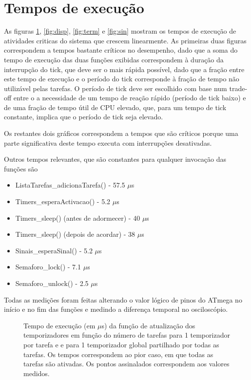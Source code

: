 \documentclass[journal]{IEEEtran}
\begin{document}
\section{Tempos de execução}

As figuras \ref{fig:timers}, \ref{fig:disp}, \ref{fig:term} e \ref{fig:sin} mostram os tempos de execução de atividades criticas do sistema que crescem linearmente.
As primeiras duas figuras correspondem a tempos bastante críticos no desempenho, dado que a soma do tempo de execução das duas funções exibidas correspondem à duração da
interrupção do tick, que deve ser o mais rápida possível, dado que a fração entre este tempo de execução e o período do tick corresponde à fração de tempo não utilizável
pelas tarefas.
O período de tick deve ser escolhido com base num trade-off entre o a necessidade de um tempo de reação rápido (período de tick baixo) e de uma fração de tempo útil de
CPU elevado, que, para um tempo de tick constante, implica que o período de tick seja elevado.

Os restantes dois gráficos correspondem a tempos que são críticos porque uma parte significativa deste tempo executa com interrupções desativadas.

Outros tempos relevantes, que são constantes para qualquer invocação das funções são
\begin{itemize}
	\item ListaTarefas\_adicionaTarefa() - 57.5 $\mu$s
	\item Timers\_esperaActivacao() - 5.2 $\mu$s
	\item Timers\_sleep() (antes de adormecer) - 40 $\mu$s
	\item Timers\_sleep() (depois de acordar) - 38 $\mu$s
	\item Sinais\_esperaSinal() - 5.2 $\mu$s
	\item Semaforo\_lock() - 7.1 $\mu$s
	\item Semaforo\_unlock() - 2.5 $\mu$s 
\end{itemize}

Todas as medições foram feitas alterando o valor lógico de pinos do ATmega no início e no fim das funções e medindo a diferença temporal no osciloscópio.

\begin{figure}
	\centering
	\resizebox{0.5\textwidth}{!}{\large }
	\caption{Tempo de execução (em $\mu$s) da função de atualização dos temporizadores em função do número de tarefas para 1 temporizador por tarefa e e para 1 temporizador global
	partilhado por todas as tarefas. Os tempos correspondem ao pior caso, em que todas as tarefas são ativadas. Os pontos assinalados correspondem aos valores medidos.}
	\label{fig:timers}
\end{figure}
\end{document}
